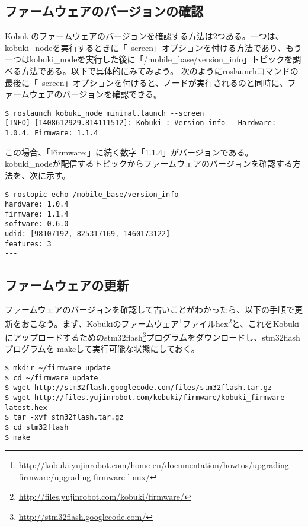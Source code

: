 \begin{itemize}
\subsection{ファームウェアのバージョンの確認}

Kobukiのファームウェアのバージョンを確認する方法は2つある。一つは、kobuki\_nodeを実行するときに「--screen」オプションを付ける方法であり、もう一つはkobuki\_nodeを実行した後に「/mobile\_base/version\_info」トピックを調べる方法である。以下で具体的にみてみよう。
次のようにroslaunchコマンドの最後に「--screen」オプションを付けると、ノードが実行されるのと同時に、ファームウェアのバージョンを確認できる。

\begin{lstlisting}[language=ROS]
$ roslaunch kobuki_node minimal.launch --screen
[INFO] [1408612929.814111512]: Kobuki : Version info - Hardware: 1.0.4. Firmware: 1.1.4
\end{lstlisting}

この場合、「Firmware:」に続く数字「1.1.4」がバージョンである。
kobuki\_nodeが配信するトピックからファームウェアのバージョンを確認する方法を、次に示す。

\begin{lstlisting}[language=ROS]
$ rostopic echo /mobile_base/version_info
hardware: 1.0.4
firmware: 1.1.4
software: 0.6.0
udid: [98107192, 825317169, 1460173122]
features: 3
---
\end{lstlisting}

\subsection{ファームウェアの更新}

ファームウェアのバージョンを確認して古いことがわかったら、以下の手順で更新をおこなう。まず、Kobukiのファームウェア\footnote{\url{http://kobuki.yujinrobot.com/home-en/documentation/howtos/upgrading-firmware/upgrading-firmware-linux/}}ファイルhex\footnote{\url{http://files.yujinrobot.com/kobuki/firmware/}}と、これをKobukiにアップロードするためのstm32flash\footnote{\url{http://stm32flash.googlecode.com/}}プログラムをダウンロードし、stm32flashプログラムを makeして実行可能な状態にしておく。

\begin{lstlisting}[language=ROS]
$ mkdir ~/firmware_update
$ cd ~/firmware_update
$ wget http://stm32flash.googlecode.com/files/stm32flash.tar.gz
$ wget http://files.yujinrobot.com/kobuki/firmware/kobuki_firmware-latest.hex
$ tar -xvf stm32flash.tar.gz
$ cd stm32flash
$ make
\end{lstlisting}


\end{itemize}
